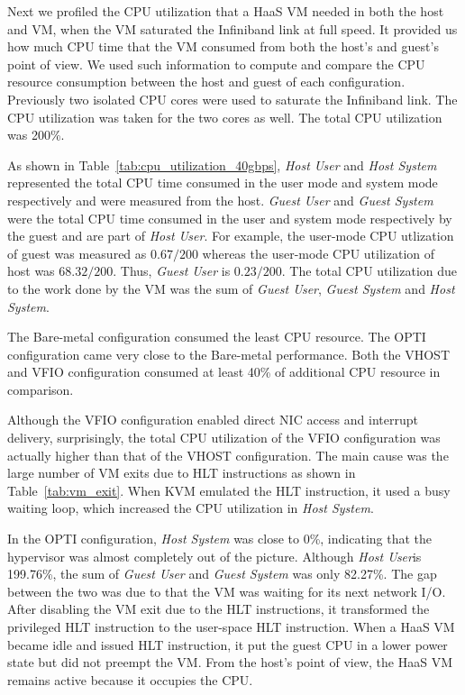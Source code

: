 Next we profiled the CPU utilization that a HaaS VM needed in
both the host and VM, when the VM saturated the Infiniband
link at full speed. It provided us how much CPU time that the
VM consumed from both the host's and guest's point of view. We
used such information to compute and compare the CPU resource
consumption between the host and guest of each configuration.
Previously two isolated CPU cores were used to saturate the
Infiniband link. The CPU utilization was taken for the two
cores as well. The total CPU utilization was 200\%.

As shown in Table~\ref{tab:cpu_utilization_40gbps}, \emph{Host
User} and \emph{Host System} represented the total CPU time
consumed in the user mode and system mode respectively and
were measured from the host. \emph{Guest User} and \emph{Guest
System} were the total CPU time consumed in the user and
system mode respectively by the guest and are part of
\emph{Host User}. For example, the user-mode CPU utlization of
guest was measured as $0.67/200$ whereas the user-mode CPU
utilization of host was $68.32/200$. Thus, \emph{Guest User}
is $0.23/200$. The total CPU utilization due to the work done
by the VM was the sum of \emph{Guest User}, \emph{Guest
System} and \emph{Host System}.

The Bare-metal configuration consumed the least CPU resource.
The OPTI configuration came very close to the Bare-metal
performance. Both the VHOST and VFIO configuration consumed at
least 40\% of additional CPU resource in comparison.

Although the VFIO configuration enabled direct NIC access and
interrupt delivery, surprisingly, the total CPU utilization of
the VFIO configuration was actually higher than that of the
VHOST configuration. The main cause was the large number of VM
exits due to HLT instructions as shown in
Table~\ref{tab:vm_exit}. When KVM emulated the HLT
instruction, it used a busy waiting loop, which
increased the CPU utilization in \emph{Host System}.

In the OPTI configuration, \emph{Host System} was close to
0\%, indicating that the hypervisor was almost completely out
of the picture. Although \emph{Host User}is 199.76\%, the sum
of \emph{Guest User} and \emph{Guest System} was only 82.27\%.
The gap between the two was due to that the VM was waiting for
its next network I/O. After disabling the VM exit due to the
HLT instructions, it transformed the privileged HLT
instruction to the user-space HLT instruction. When a HaaS VM
became idle and issued HLT instruction, it put the guest CPU
in a lower power state but did not preempt the VM. From the
host's point of view, the HaaS VM remains active because it
occupies the CPU.


